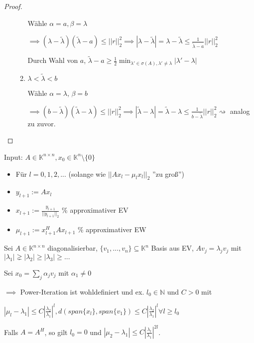 \begin{proof}
\begin{enumerate}
\begin{enumerate}
			Wähle $\alpha = a, \beta = \lambda$
			
			$\implies (\lambda - \tilde{\lambda}) (\tilde{\lambda} - a) \leq ||r||_2^2 \implies |\lambda - \tilde{\lambda}| = \lambda - \tilde{\lambda} \leq \frac{1}{\tilde{\lambda} - a}||r||_2^2$
			
			Durch Wahl von $a$, $\tilde{\lambda} - a \geq \frac{1}{2} \min_{\lambda' \in \sigma(A), \lambda' \neq \lambda} |\lambda' - \lambda|$
			
			\item $\lambda < \tilde{\lambda} < b$
			
			Wähle $\alpha = \lambda$, $\beta = b$
			
			$\implies (b-\tilde{\lambda})(\tilde{\lambda} - \lambda) \leq ||r||_2^2 \implies |\tilde{\lambda} - \lambda| = \tilde{\lambda} - \lambda \leq \frac{1}{b-\tilde{\lambda}} ||r||_2^2 \rightsquigarrow$ analog zu zuvor.
		\end{enumerate}
	\end{enumerate}
\end{proof}

\begin{algorithm}
	Input: $A \in \mathbb{K}^{n\times n}, x_0 \in \mathbb{K}^n\setminus\{0\}$
	\begin{itemize}
		\item Für $l=0,1,2,...$ (solange wie $||Ax_l - \mu_lx_l||_2$ ''zu groß'')
		\item \hspace{0.5cm} $y_{l+1} := Ax_l$
		\item \hspace{0.5cm} $x_{l+1} := \frac{y_{l+1}}{||y_{l+1}||_2}$ \% approximativer EV
		\item \hspace{0.5cm} $\mu_{l+1} := x_{l+1}^HAx_{l+1}$ \% approximativer EW
	\end{itemize}
\end{algorithm}

\begin{theorem}
	Sei $A \in \mathbb{K}^{n\times n}$ diagonalisierbar, $\{v_1, ..., v_n\} \subseteq \mathbb{K}^n$ Basis aus EV, $Av_j = \lambda_j v_j$ mit $|\lambda_1| \gneq |\lambda_2| \geq |\lambda_3| \geq ...$
	
	Sei $x_0 = \sum_{j} \alpha_j v_j$ mit $\alpha_1 \neq 0$
	
	$\implies$ Power-Iteration ist wohldefiniert und ex. $l_0 \in \mathbb{N}$ und $C > 0$ mit
	
	$|\mu_l - \lambda_1| \leq C \left|\frac{\lambda_2}{\lambda_1}\right|^l, d(span\{x_l\}, span\{v_1\}) \leq C \left|\frac{\lambda_2}{\lambda_1}\right|^l \forall l \geq l_0$
		
	Falls $A=A^H$, so gilt $l_0 = 0$ und $|\mu_2 - \lambda_1| \leq C \left|\frac{\lambda_l}{\lambda_1}\right|^{2l}$.
\end{theorem}

